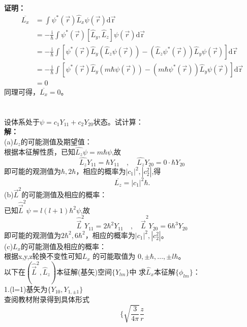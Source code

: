 \documentclass[a4paper]{article}
\newcommand{\qed}{
    \rightline{Q.E.D.}\\
    }
\begin{document}
\begin{CJK*}{UTF8}{song}
    {
    \textbf{证明：}
    \begin{equation*}
    \begin{split}
    \overline{L_{x}}
        & = \int\psi^{*}(\vec{r})\hat{L}_{x}\psi(\vec{r})\mathrm{d\vec{r}}\\
        & = -\frac{\mathrm{i}}{\hbar}\int\psi^{*}(\vec{r})
           [\hat{L}_{y},\hat{L}_{z}]\psi(\vec{r})\mathrm{d\vec{r}}\\
        & = -\frac{\mathrm{i}}{\hbar}\int[\psi^{*}(\vec{r})\hat{L}_{y}(\hat{L}_{z}\psi(\vec{r}))
            -(\hat{L}_{z}\psi^{*}(\vec{r}))\hat{L}_{y}\psi(\vec{r})]\mathrm{d\vec{r}}\\
        & = -\frac{\mathrm{i}}{\hbar}\int[\psi^{*}(\vec{r})\hat{L}_{y}(m\hbar\psi(\vec{r}))
            -(m\hbar\psi^{*}(\vec{r}))\hat{L}_{y}\psi(\vec{r})]\mathrm{d\vec{r}}\\
        & = 0
    \end{split}
    \end{equation*}
    同理可得，$\overline{L_{x}}=0$。\\
    \qed
    }\\[20pt]
     设体系处于$\psi = c_{1}Y_{11}+c_{2}Y_{20}$状态。试计算：\\[8pt]
    {
    \textbf{解：}\\[5pt]
    (a)$L_{z}$的可能测值及期望值：\\
    根据本征解性质，已知$\hat{L_{z}}\psi = m\hbar\psi$,故
    $$\hat{L_{z}}Y_{11}=\hbar Y_{11}\quad,\quad\hat{L_{z}}Y_{20}=0\cdot\hbar Y_{20}$$
    即可能的观测值为$\hbar,2\hbar$，相应的概率为$|c_{1}|^{2},|c_{2}^{2}|$,得
    $$\overline{L_{z}}=|c_{1}|^{2}\hbar.$$
    (b)$\vec{L}^{2}$的可能测值及相应的概率：\\
    已知$\hat{\vec{L}}^{2}\psi = l(l+1)\hbar^{2}\psi$,故
    $$\hat{\vec{L}}^{2}Y_{11}=2\hbar^{2} Y_{11}\quad,
        \quad\hat{\vec{L}}^{2}Y_{20}=6\hbar^{3} Y_{20}$$
    即可能的观测值为$2\hbar^{2},6\hbar^{2}$，相应的概率为$|c_{1}|^{2},|c_{2}^{2}|$。\\[5pt]
    (c)$L_{x}$的可能测值及相应的概率：\\
    根据x,y,z轮换不变性可知$L_{x}$ 的可能取值为 $0,\pm\hbar,...,\pm l\hbar$。\\
    以下在$(\hat{\vec{L}}^{2},\hat{L}_{z})$本征解(基矢)空间$\{Y_{lm}\}$中
        求$\hat{L}_{x}$本征解$\{\phi_{lm}\}$：\\
    1.(l=1)基矢为$\{Y_{10},Y_{1,\pm1}\}$\\
    \indent 查阅教材附录得到具体形式
    $$\{\sqrt{\frac{3}{4\pi}}\frac{z}{r}
$$}
\end{CJK*}
\end{document}
